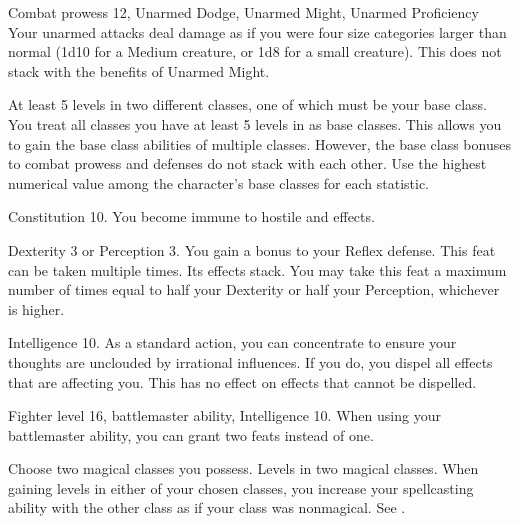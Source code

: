 \featpres Combat prowess 12, Unarmed Dodge, Unarmed Might, Unarmed Proficiency
\featben Your unarmed attacks deal damage as if you were four size categories larger than normal (1d10 for a Medium creature, or 1d8 for a small creature).
This does not stack with the benefits of Unarmed Might.

\featpres At least 5 levels in two different classes, one of which must be your base class.
\featben You treat all classes you have at least 5 levels in as base classes.
This allows you to gain the base class abilities of multiple classes.
However, the base class bonuses to combat prowess and defenses do not stack with each other.
Use the highest numerical value among the character's base classes for each statistic.

\featpre Constitution 10.
\featben You become immune to hostile  and  effects.

\featpre Dexterity 3 or Perception 3.
\featben You gain a  bonus to your Reflex defense.
 This feat can be taken multiple times. Its effects stack.
You may take this feat a maximum number of times equal to half your Dexterity or half your Perception, whichever is higher.

\featpre Intelligence 10.
\featben As a standard action, you can concentrate to ensure your thoughts are unclouded by irrational influences.
If you do, you dispel all  effects that are affecting you.
This has no effect on effects that cannot be dispelled.

\featpres Fighter level 16, battlemaster ability, Intelligence 10.
\featben When using your battlemaster ability, you can grant two feats instead of one.

Choose two magical classes you possess.
\featpres
Levels in two magical classes.
\featben When gaining levels in either of your chosen classes, you increase your spellcasting ability with the other class as if your class was nonmagical.
See .

